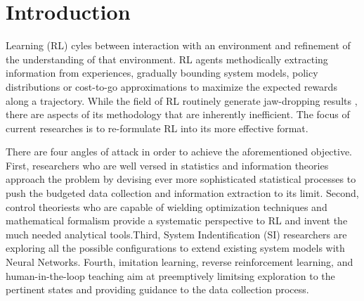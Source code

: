 \documentclass[journal]{IEEEtran}
\begin{document}
\section{Introduction}
 Learning (RL) cyles between interaction with an environment and refinement of the understanding of that environment. RL agents methodically extracting information from experiences, gradually bounding system models, policy distributions or cost-to-go approximations to maximize the expected rewards along a trajectory. While the field of RL routinely generate jaw-dropping results \cite{Mnih2013PlayingAW}\cite{Hausknecht2015DeepRQ}\cite{Andrychowicz2020LearningDI}\cite{Kalashnikov2018QTOptSD}\cite{Lee2020LearningQL}, there are aspects of its methodology that are inherently inefficient. The focus of current researches is to re-formulate RL into its more effective format.

There are four angles of attack in order to achieve the aforementioned objective. First, researchers who are well versed in statistics and information theories approach the problem by devising ever more sophisticated statistical processes to push the budgeted data collection and information extraction to its limit.\cite{Ho2016GenerativeAI}\cite{Finn2016UnsupervisedLF}\cite{Pathak2017CuriosityDrivenEB}\cite{Burda2019LargeScaleSO}\cite{Finn2017ModelAgnosticMF}\cite{Mishra2018ASN}\cite{Nachum2018DataEfficientHR}\cite{Vezhnevets2017FeUdalNF}\cite{Blundell2015WeightUI}\cite{Gal2017ConcreteD}\cite{Dasgupta2019CausalRF}\cite{Zhang2020DesigningOD} Second, control theoriests who are capable of wielding optimization techniques and mathematical formalism provide a systematic perspective to RL and invent the much needed analytical tools.\cite{Han2020ActorCriticRL}\cite{Weinan2017APO}\cite{Dupont2019AugmentedNO}\cite{Betancourt2018OnSO}\cite{Nachum2020ReinforcementLV}\cite{Luo2019ADR}\cite{Wu2020DataDrivenDL}\cite{Shi2019NeuralLS}Third, System Indentification (SI) researchers are exploring all the possible configurations to extend existing system models with Neural Networks. \cite{Hewing2020LearningBasedMP}\cite{Mohan2020EmbeddingHP}\cite{Lusch2018DeepLF}\cite{Bai2019DeepEM}\cite{BelbutePeres2020CombiningDP} Fourth, imitation learning, reverse reinforcement learning, and human-in-the-loop teaching aim at preemptively limitsing exploration to the pertinent states and providing guidance to the data collection process. \cite{Knox2009InteractivelySA}\cite{Knox2010CombiningMF}\cite{Peng2018DeepMimicED}\cite{Peng2020LearningAR}\cite{Paine2018OneShotHI}
\end{document}
